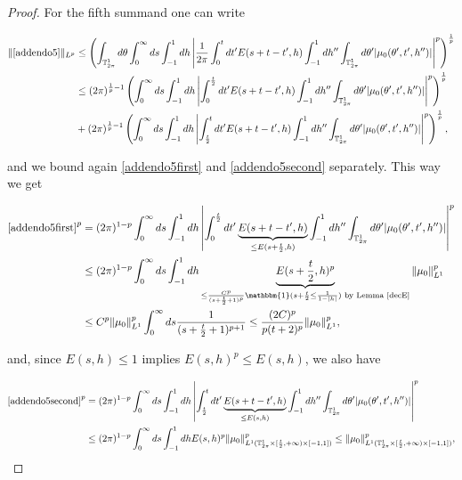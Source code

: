 \documentclass[a4paper,10pt,reqno]{amsart}
\numberwithin{equation}{subsection}
\numberwithin{figure}{subsection}
\begin{document}
\begin{proof}
For the fifth summand one can write

{\footnotesize\begin{align}
\nonumber\|\eqref{addendo5}\|_{L^p}&\leq\left(\int_{\mathbb{T}^1_{2\pi}}d\theta\int_0^{\infty}ds\int_{-1}^1dh\left|\frac{1}{2\pi}\int_0^tdt' E(s+t-t',h)\int_{-1}^1dh''\int_{\mathbb{T}^1_{2\pi}}d\theta'|\mu_0(\theta',{t'},h'')|\right|^p\right)^{\frac{1}{p}}
\\
\label{addendo5first}&\leq(2\pi)^{\frac{1}{p}-1}\left(\int_0^{\infty}ds\int_{-1}^1dh\left|\int_0^{\frac{t}{2}}dt' E(s+t-t',h)\int_{-1}^1dh''\int_{\mathbb{T}^1_{2\pi}}d\theta'|\mu_0(\theta',{t'},h'')|\right|^p\right)^{\frac{1}{p}}
\\
\label{addendo5second}&+(2\pi)^{\frac{1}{p}-1}\left(\int_0^{\infty}ds\int_{-1}^1dh\left|\int_{\frac{t}{2}}^tdt' E(s+t-t',h)\int_{-1}^1dh''\int_{\mathbb{T}^1_{2\pi}}d\theta'|\mu_0(\theta',{t'},h'')|\right|^p\right)^{\frac{1}{p}},
\end{align}}

and we bound again \eqref{addendo5first} and \eqref{addendo5second} separately. This way we get

{\small\begin{align*}
\eqref{addendo5first}^p&=(2\pi)^{1-p}\int_0^{\infty}ds\int_{-1}^1dh\left|\int_0^{\frac{t}{2}}dt' \underbrace{E(s+t-t',h)}_{\leq E(s+\frac{t}{2},h)}\int_{-1}^1dh''\int_{\mathbb{T}^1_{2\pi}}d\theta'|\mu_0(\theta',{t'},h'')|\right|^p
\\
&\leq(2\pi)^{1-p}\int_0^{\infty}ds\int_{-1}^1dh\underbrace{E(s+\frac{t}{2},h)^p}_{\leq\frac{C^p}{(s+\frac{t}{2}+1)^p}\mathbbm{1}(s+\frac{t}{2}\leq\frac{1}{1-|h|})\textrm{ by Lemma \ref{decE}}}\|\mu_0\|_{L^1}^p
\\
&\leq C^p\|\mu_0\|_{L^1}^p\int_0^{\infty}ds\frac{1}{(s+\frac{t}{2}+1)^{p+1}}\leq \frac{(2C)^p}{p(t+2)^p}\|\mu_0\|_{L^1}^p,
\end{align*}}

and, since $E(s,h)\leq1$ implies $ E(s,h)^p\leq E(s,h)$, we also have

{\scriptsize\begin{align*}
\eqref{addendo5second}^p&=(2\pi)^{1-p}\int_0^{\infty}ds\int_{-1}^1dh\left|\int_{\frac{t}{2}}^tdt' \underbrace{E(s+t-t',h)}_{\leq E(s,h)}\int_{-1}^1dh''\int_{\mathbb{T}^1_{2\pi}}d\theta'|\mu_0(\theta',{t'},h'')|\right|^p
\\
&\leq(2\pi)^{1-p}\int_0^{\infty}ds\int_{-1}^1dhE(s,h)^p\|\mu_0\|_{L^1(\mathbb{T}^1_{2\pi}\times[\frac{t}{2},+\infty)\times[-1,1])}^p\leq \|\mu_0\|_{L^1(\mathbb{T}^1_{2\pi}\times[\frac{t}{2},+\infty)\times[-1,1])}^p,
\end{align*}}


\end{proof}
\end{document}
